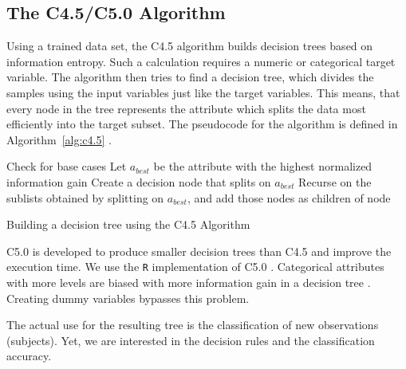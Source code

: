 \documentclass[a4paper,twoside]{style/article}
\begin{document}
\subsection{The C4.5/C5.0 Algorithm}
Using a trained data set, the C4.5 algorithm builds decision trees based on information entropy.
Such a calculation requires a numeric or categorical target variable.
The algorithm then tries to find a decision tree, which divides the samples using the input variables just like the target variables.
This means, that every node in the tree represents the attribute which splits the data most efficiently into the target subset.
The pseudocode for the algorithm is defined in Algorithm~\ref{alg:c4.5} \cite{C4.5Algorithm}.
\begin{algorithm}[]
 Check for base cases\;
 Let $a_{best}$ be the attribute with the highest normalized information gain\;
 Create a decision node that splits on $a_{best}$\;
 Recurse on the sublists obtained by splitting on $a_{best}$, and add those nodes as children of node\;
 \caption{Building a decision tree using the C4.5 Algorithm}
 \label{alg:c4.5}
\end{algorithm}
C5.0 is developed to produce smaller decision trees than C4.5 and improve the execution time.
We use the \texttt{R} implementation of C5.0 \cite{c5.0lassification}.
Categorical attributes with more levels are biased with more information gain in a decision tree \cite{deng2011bias}.
Creating dummy variables bypasses this problem.

The actual use for the resulting tree is the classification of new observations (subjects).
Yet, we are interested in the decision rules and the classification accuracy.
\end{document}

